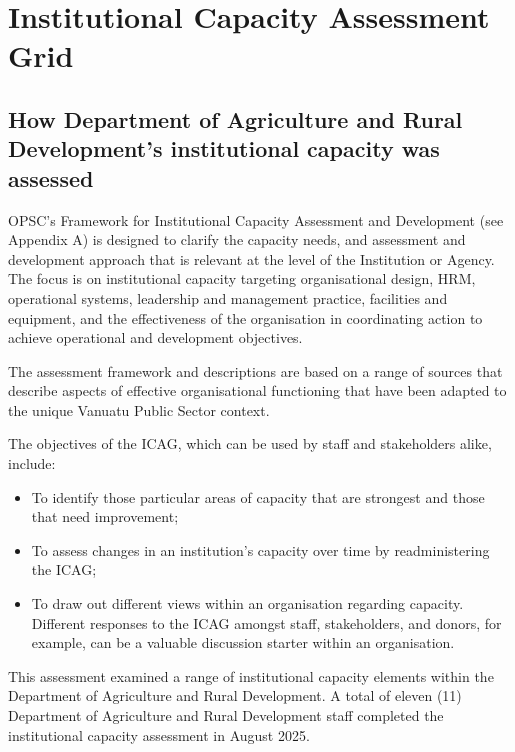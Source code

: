 \documentclass[
  10pt,
]{report}
\providecommand{\tightlist}{%
  \setlength{\itemsep}{0pt}\setlength{\parskip}{0pt}}
\begin{document}
\chapter{Institutional Capacity Assessment
Grid}\label{institutional-capacity-assessment-grid}

\section{How Department of Agriculture and Rural Development's
institutional capacity was
assessed}\label{how-department-of-agriculture-and-rural-developments-institutional-capacity-was-assessed}

OPSC's Framework for Institutional Capacity Assessment and Development
(see Appendix A) is designed to clarify the capacity needs, and
assessment and development approach that is relevant at the level of the
Institution or Agency. The focus is on institutional capacity targeting
organisational design, HRM, operational systems, leadership and
management practice, facilities and equipment, and the effectiveness of
the organisation in coordinating action to achieve operational and
development objectives.

The assessment framework and descriptions are based on a range of
sources that describe aspects of effective organisational functioning
that have been adapted to the unique Vanuatu Public Sector context.

The objectives of the ICAG, which can be used by staff and stakeholders
alike, include:

\begin{itemize}
\tightlist
\item
  To identify those particular areas of capacity that are strongest and
  those that need improvement;
\item
  To assess changes in an institution's capacity over time by
  readministering the ICAG;
\item
  To draw out different views within an organisation regarding capacity.
  Different responses to the ICAG amongst staff, stakeholders, and
  donors, for example, can be a valuable discussion starter within an
  organisation.
\end{itemize}

This assessment examined a range of institutional capacity elements
within the Department of Agriculture and Rural Development. A total of
eleven (11) Department of Agriculture and Rural Development staff
completed the institutional capacity assessment in August 2025.
\end{document}
